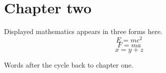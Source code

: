 \section{Chapter two}
Displayed mathematics appears in three forms here.
\[ E = m c^2 \]
$$ F = m a $$
\begin{equation}
\label{eq:two}
x = y + z
\end{equation}

Words after the cycle back to chapter one.
